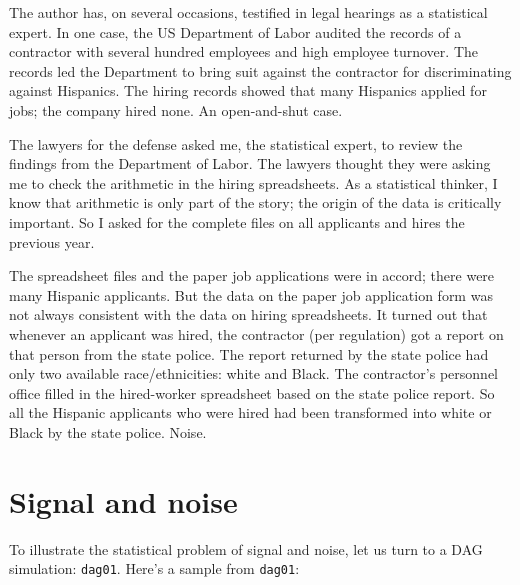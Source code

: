 \documentclass[
  letterpaper,
  DIV=11,
  numbers=noendperiod,
  oneside]{scrreprt}
\begin{document}
\begin{tcolorbox}[enhanced jigsaw, colbacktitle=quarto-callout-note-color!10!white, breakable, opacitybacktitle=0.6, colback=white, left=2mm, arc=.35mm, colframe=quarto-callout-note-color-frame, coltitle=black, toprule=.15mm, opacityback=0, leftrule=.75mm, bottomtitle=1mm, toptitle=1mm, titlerule=0mm, title=\textcolor{quarto-callout-note-color}{\faInfo}\hspace{0.5em}{Noise in hiring}, rightrule=.15mm, bottomrule=.15mm]

The author has, on several occasions, testified in legal hearings as a
statistical expert. In one case, the US Department of Labor audited the
records of a contractor with several hundred employees and high employee
turnover. The records led the Department to bring suit against the
contractor for discriminating against Hispanics. The hiring records
showed that many Hispanics applied for jobs; the company hired none. An
open-and-shut case.

The lawyers for the defense asked me, the statistical expert, to review
the findings from the Department of Labor. The lawyers thought they were
asking me to check the arithmetic in the hiring spreadsheets. As a
statistical thinker, I know that arithmetic is only part of the story;
the origin of the data is critically important. So I asked for the
complete files on all applicants and hires the previous year.

The spreadsheet files and the paper job applications were in accord;
there were many Hispanic applicants. But the data on the paper job
application form was not always consistent with the data on hiring
spreadsheets. It turned out that whenever an applicant was hired, the
contractor (per regulation) got a report on that person from the state
police. The report returned by the state police had only two available
race/ethnicities: white and Black. The contractor's personnel office
filled in the hired-worker spreadsheet based on the state police report.
So all the Hispanic applicants who were hired had been transformed into
white or Black by the state police. Noise.

\end{tcolorbox}

\hypertarget{sec-signal-and-noise}{%
\section{Signal and noise}\label{sec-signal-and-noise}}

To illustrate the statistical problem of signal and noise, let us turn
to a DAG simulation: \texttt{dag01}. Here's a sample from
\texttt{dag01}:
\end{document}
